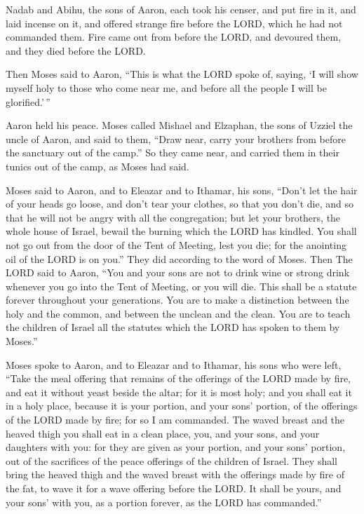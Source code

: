  Nadab and Abihu, the sons of Aaron, each took his censer,
and put fire in it, and laid incense on it, and offered strange fire
before the LORD, which he had not commanded them.  Fire came
out from before the LORD, and devoured them, and they died before the
LORD.

 Then Moses said to Aaron, ``This is what the LORD spoke of,
saying, `I will show myself holy to those who come near me, and before
all the people I will be glorified.'\,''

Aaron held his peace.  Moses called Mishael and Elzaphan,
the sons of Uzziel the uncle of Aaron, and said to them, ``Draw near,
carry your brothers from before the sanctuary out of the camp.''
 So they came near, and carried them in their tunics out of
the camp, as Moses had said.

 Moses said to Aaron, and to Eleazar and to Ithamar, his
sons, ``Don't let the hair of your heads go loose, and don't tear your
clothes, so that you don't die, and so that he will not be angry with
all the congregation; but let your brothers, the whole house of Israel,
bewail the burning which the LORD has kindled.  You shall
not go out from the door of the Tent of Meeting, lest you die; for the
anointing oil of the LORD is on you.'' They did according to the word of
Moses.  Then The LORD said to Aaron,  ``You and
your sons are not to drink wine or strong drink whenever you go into the
Tent of Meeting, or you will die. This shall be a statute forever
throughout your generations.  You are to make a distinction
between the holy and the common, and between the unclean and the clean.
 You are to teach the children of Israel all the statutes
which the LORD has spoken to them by Moses.''

 Moses spoke to Aaron, and to Eleazar and to Ithamar, his
sons who were left, ``Take the meal offering that remains of the
offerings of the LORD made by fire, and eat it without yeast beside the
altar; for it is most holy;  and you shall eat it in a holy
place, because it is your portion, and your sons' portion, of the
offerings of the LORD made by fire; for so I am commanded. 
The waved breast and the heaved thigh you shall eat in a clean place,
you, and your sons, and your daughters with you: for they are given as
your portion, and your sons' portion, out of the sacrifices of the peace
offerings of the children of Israel.  They shall bring the
heaved thigh and the waved breast with the offerings made by fire of the
fat, to wave it for a wave offering before the LORD. It shall be yours,
and your sons' with you, as a portion forever, as the LORD has
commanded.''

